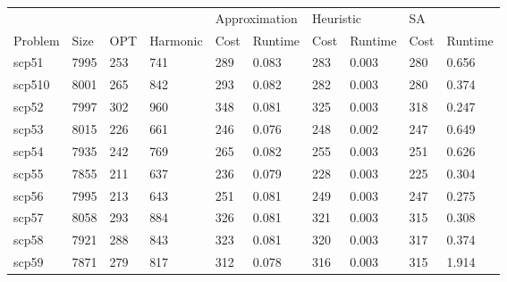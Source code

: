 \begin{table}[h]
\centering
\begin{tabular}{@{}llllllllll@{}}
\toprule
        &      &     &          & \multicolumn{2}{l}{Approximation} & \multicolumn{2}{l}{Heuristic} & \multicolumn{2}{l}{SA} \\
Problem & Size & OPT & Harmonic & Cost           & Runtime          & Cost         & Runtime        & Cost     & Runtime     \\ \midrule
scp51   & 7995 & 253 & 741      & 289            & 0.083            & 283          & 0.003          & 280      & 0.656       \\
scp510  & 8001 & 265 & 842      & 293            & 0.082            & 282          & 0.003          & 280      & 0.374       \\
scp52   & 7997 & 302 & 960      & 348            & 0.081            & 325          & 0.003          & 318      & 0.247       \\
scp53   & 8015 & 226 & 661      & 246            & 0.076            & 248          & 0.002          & 247      & 0.649       \\
scp54   & 7935 & 242 & 769      & 265            & 0.082            & 255          & 0.003          & 251      & 0.626       \\
scp55   & 7855 & 211 & 637      & 236            & 0.079            & 228          & 0.003          & 225      & 0.304       \\
scp56   & 7995 & 213 & 643      & 251            & 0.081            & 249          & 0.003          & 247      & 0.275       \\
scp57   & 8058 & 293 & 884      & 326            & 0.081            & 321          & 0.003          & 315      & 0.308       \\
scp58   & 7921 & 288 & 843      & 323            & 0.081            & 320          & 0.003          & 317      & 0.374       \\
scp59   & 7871 & 279 & 817      & 312            & 0.078            & 316          & 0.003          & 315      & 1.914       \\ \bottomrule
\end{tabular}
\end{table}

